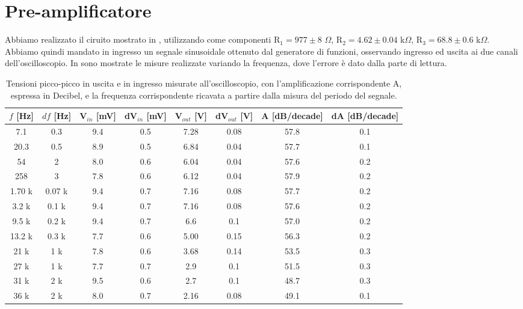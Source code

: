 \section{Pre-amplificatore}
Abbiamo realizzato il ciruito mostrato in , utilizzando come componenti R$_1 = 977 \pm 8$ $\Omega$, R$_2 = 4.62 \pm 0.04$ k$\Omega$, R$_3 = 68.8 \pm 0.6$ k$\Omega$. Abbiamo quindi mandato in ingresso un segnale sinusoidale ottenuto dal generatore di funzioni, osservando ingresso ed uscita ai due canali dell'oscilloscopio. In  sono mostrate le misure realizzate variando la frequenza, dove l'errore è dato dalla parte di lettura.\\
\begin{table}[h]
	\centering
	\begin{tabular}{cccccccc}		
		 {$f$ [Hz]}& {$df$ [Hz]}& {V$_{in}$ [mV]} & {dV$_{in}$ [mV]} & {V$_{out}$ [V]} & {dV$_{out}$ [V]} & {A [dB/decade]} & {dA [dB/decade]}\\
		 \midrule
                       7.1 & 0.3 & 9.4 & 0.5 & 7.28 & 0.08 & 57.8 & 0.1\\
                       20.3 & 0.5 & 8.9 & 0.5 & 6.84 & 0.04 & 57.7 & 0.1\\
                       54 & 2 & 8.0 & 0.6 & 6.04 & 0.04 & 57.6 & 0.2\\ 
                       258 & 3 & 7.8 & 0.6 & 6.12 & 0.04 & 57.9 & 0.2\\
                       1.70 k& 0.07 k& 9.4 & 0.7 & 7.16 & 0.08 & 57.7 & 0.2\\
                       3.2 k& 0.1 k& 9.4 & 0.7 & 7.16 & 0.08 & 57.6 & 0.2\\
                       9.5 k& 0.2 k& 9.4 & 0.7 & 6.6 & 0.1 & 57.0 & 0.2\\ 
                       13.2 k& 0.3 k& 7.7 & 0.6 & 5.00 & 0.15 & 56.3 & 0.2\\
                       21 k& 1 k& 7.8 & 0.6 & 3.68 & 0.14 & 53.5 & 0.3\\
                       27 k& 1 k& 7.7 & 0.7 & 2.9 & 0.1 & 51.5 & 0.3\\
                       31 k& 2 k& 9.5 & 0.6 & 2.7 & 0.1 & 48.7 & 0.3\\
                       36 k& 2 k& 8.0 & 0.7 & 2.16 & 0.08 & 49.1 & 0.1\\
 	\end{tabular}
	\caption{ Tensioni picco-picco in uscita e in ingresso misurate all'oscilloscopio, con l'amplificazione corrispondente A, espressa in Decibel, e la frequenza corrispondente ricavata a partire dalla misura del periodo del segnale.}
	\label{t:pre-amp}
\end{table}
